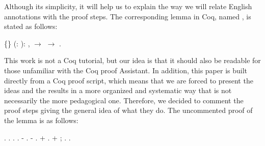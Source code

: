  Although its simplicity, it will help us to explain the way we will
relate English annotations with the proof steps. The corresponding
lemma in Coq, named , is stated as follows: \begin{coqdoccode}
\coqdocemptyline
\coqdocnoindent
{}  \{\} (:  ): \coqdockw{\ensuremath{\forall}}   ,     \ensuremath{\rightarrow}     \ensuremath{\rightarrow}    .\coqdoceol
\coqdocemptyline
\end{coqdoccode}
This work is not a Coq tutorial, but our idea is that it should
also be readable for those unfamiliar with the Coq proof Assistant. In
addition, this paper is built directly from a Coq proof script, which
means that we are forced to present the ideas and the results in a
more organized and systematic way that is not necessarily the more
pedagogical one. Therefore, we decided to comment the proof steps
giving the general idea of what they do. The uncommented proof of the
 lemma  is as follows:


\coqdoceol
\coqdocemptyline
\coqdocnoindent
{}.\coqdoceol
\coqdocindent{0.50em}
   .\coqdoceol
\coqdocindent{0.50em}
  .\coqdoceol
\coqdocindent{0.50em}
 .\coqdoceol
\coqdocindent{0.50em}
- .\coqdoceol
\coqdocindent{0.50em}
-    .\coqdoceol
\coqdocindent{1.50em}
+ .\coqdoceol
\coqdocindent{1.50em}
+  ; .\coqdoceol
\coqdocnoindent
{}.

\coqdocemptyline


